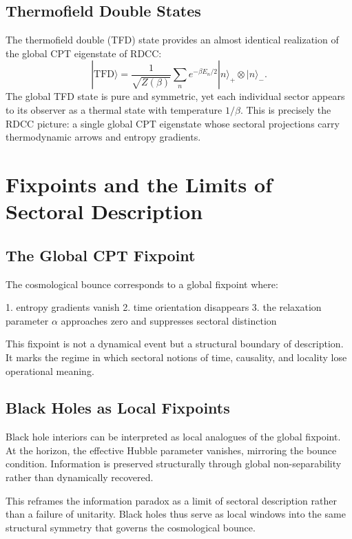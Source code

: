 \documentclass[11pt,a4paper]{article}
\begin{document}
\subsection{Thermofield Double States}

The thermofield double (TFD) state provides an almost identical realization of the global CPT eigenstate of RDCC:
\[
|\text{TFD}\rangle = \frac{1}{\sqrt{Z(\beta)}} \sum_n e^{-\beta E_n/2} |n\rangle_+ \otimes |n\rangle_-.
\]
The global TFD state is pure and symmetric, yet each individual sector appears to its observer as a thermal state with temperature $1/\beta$. This is precisely the RDCC picture: a single global CPT eigenstate whose sectoral projections carry thermodynamic arrows and entropy gradients.

\section{Fixpoints and the Limits of Sectoral Description}

\subsection{The Global CPT Fixpoint}

The cosmological bounce corresponds to a global fixpoint where:

1. entropy gradients vanish  
2. time orientation disappears  
3. the relaxation parameter $\alpha$ approaches zero and suppresses sectoral distinction  

This fixpoint is not a dynamical event but a structural boundary of description. It marks the regime in which sectoral notions of time, causality, and locality lose operational meaning.

\subsection{Black Holes as Local Fixpoints}

Black hole interiors can be interpreted as local analogues of the global fixpoint. At the horizon, the effective Hubble parameter vanishes, mirroring the bounce condition. Information is preserved structurally through global non-separability rather than dynamically recovered.

This reframes the information paradox as a limit of sectoral description rather than a failure of unitarity. Black holes thus serve as local windows into the same structural symmetry that governs the cosmological bounce.
\end{document}
